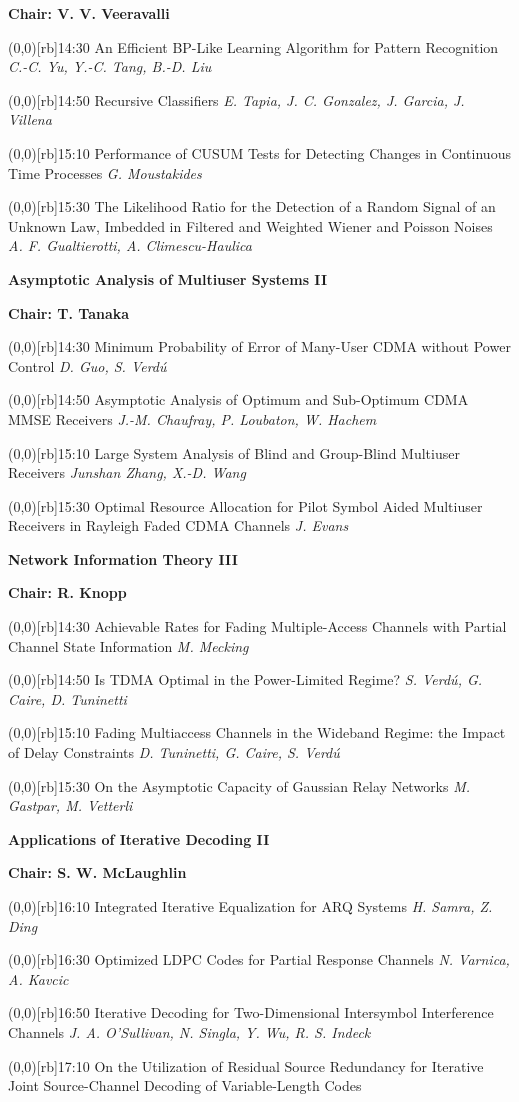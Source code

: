 \documentclass[a5paper,twoside]{article}
\def\period#1{\flushleft{\large\bfseries #1}\markboth{\sf #1}{\sf #1}}
\def\sesstitle#1{\vspace{.45\bigskipamount}\par{\bfseries #1}\par}
\def\sesschair#1{{\bfseries Chair: #1}\par\vspace{.65\medskipamount}}
\def\papertime#1{\makebox(0,0)[rb]{{\scriptsize #1}\hspace{.5em}}}
\def\papertitle#1{#1\hfil\break}
\def\paperauthors#1{{\itshape #1}\par\filbreak\vspace{.65\medskipamount}}
\begin{document}
\sesschair{V. V. Veeravalli}
\papertime{14:30}%
\papertitle{An Efficient BP-Like Learning Algorithm for Pattern Recognition}
\paperauthors{C.-C. Yu, Y.-C. Tang, B.-D. Liu}
\papertime{14:50}%
\papertitle{Recursive Classifiers}
\paperauthors{E. Tapia, J. C. Gonzalez, J. Garcia, J. Villena}
\papertime{15:10}%
\papertitle{Performance of CUSUM Tests for Detecting Changes in Continuous Time Processes}
\paperauthors{G. Moustakides}
\papertime{15:30}%
\papertitle{The Likelihood Ratio for the Detection of a Random Signal of an Unknown Law, Imbedded in Filtered and Weighted Wiener and Poisson Noises}
\paperauthors{A. F. Gualtierotti, A. Climescu-Haulica}
\sesstitle{Asymptotic Analysis of Multiuser Systems II}
\sesschair{T. Tanaka}
\papertime{14:30}%
\papertitle{Minimum Probability of Error of Many-User CDMA without Power Control}
\paperauthors{D. Guo, S. Verd\'u}
\papertime{14:50}%
\papertitle{Asymptotic Analysis of Optimum and Sub-Optimum CDMA MMSE Receivers}
\paperauthors{J.-M. Chaufray, P. Loubaton, W. Hachem}
\papertime{15:10}%
\papertitle{Large System Analysis of Blind and Group-Blind Multiuser Receivers}
\paperauthors{Junshan Zhang, X.-D. Wang}
\papertime{15:30}%
\papertitle{Optimal Resource Allocation for Pilot Symbol Aided Multiuser Receivers in Rayleigh Faded CDMA Channels}
\paperauthors{J. Evans}
\sesstitle{Network Information Theory III}
\sesschair{R. Knopp}
\papertime{14:30}%
\papertitle{Achievable Rates for Fading Multiple-Access Channels with Partial Channel State Information}
\paperauthors{M. Mecking}
\papertime{14:50}%
\papertitle{Is TDMA Optimal in the Power-Limited Regime?}
\paperauthors{S. Verd\'u, G. Caire, D. Tuninetti}
\papertime{15:10}%
\papertitle{Fading Multiaccess Channels in the Wideband Regime: the Impact of Delay Constraints}
\paperauthors{D. Tuninetti, G. Caire, S. Verd\'u}
\papertime{15:30}%
\papertitle{On the Asymptotic Capacity of Gaussian Relay Networks}
\paperauthors{M. Gastpar, M. Vetterli}
\period{Tue 16:10 -- 17:50}
\sesstitle{Applications of Iterative Decoding II}
\sesschair{S. W. McLaughlin}
\papertime{16:10}%
\papertitle{Integrated Iterative Equalization for ARQ Systems}
\paperauthors{H. Samra, Z. Ding}
\papertime{16:30}%
\papertitle{Optimized LDPC Codes for Partial Response Channels}
\paperauthors{N. Varnica, A. Kavcic}
\papertime{16:50}%
\papertitle{Iterative Decoding for Two-Dimensional Intersymbol Interference Channels}
\paperauthors{J. A. O'Sullivan, N. Singla, Y. Wu, R. S. Indeck}
\papertime{17:10}%
\papertitle{On the Utilization of Residual Source Redundancy for Iterative Joint Source-Channel Decoding of Variable-Length Codes}
\end{document}
